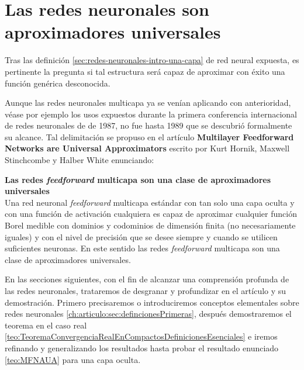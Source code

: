 %
\section{Las redes neuronales son aproximadores universales}  

Tras las definición \ref{sec:redes-neuronales-intro-una-capa} de red neural expuesta,
es pertinente la pregunta si tal estructura será 
capaz de aproximar con éxito una función genérica desconocida.   

Aunque las redes neuronales multicapa ya se venían aplicando con anterioridad, 
véase por ejemplo los usos expuestos durante la primera conferencia
internacional de redes neuronales de \cite{4307059} de 1987, 
no fue hasta 1989 que se descubrió formalmente su alcance.
 Tal delimitación se propuso en el artículo 
\textbf{Multilayer Feedforward Networks are Universal Approximators} \cite{HORNIK1989359}
 escrito por Kurt Hornik, Maxwell Stinchcombe y Halber White enunciando: 

\begin{teorema}\textbf{Las redes \textit{feedforward} multicapa son una clase de aproximadores universales } \label{teo:MFNAUA}
    \\
    Una red neuronal \textit{feedforward} multicapa estándar con tan solo una capa oculta y con una función de activación cualquiera es capaz de aproximar cualquier 
    función Borel medible  con dominios y codominios de dimensión finita (no necesariamente iguales) y con el nivel de precisión que se desee siempre y cuando 
    se utilicen suficientes neuronas. En este sentido las redes \textit{feedforward} multicapa son una clase de aproximadores universales.

\end{teorema}

En las secciones siguientes, con el fin de alcanzar una
 comprensión profunda de las redes neuronales,
trataremos de desgranar y profundizar en el artículo y su 
demostración. Primero precisaremos o introduciremos conceptos elementales 
sobre redes neuronales \ref{ch:articulo:sec:defincionesPrimeras}, después 
demostraremos el teorema en el caso real 
\ref{teo:TeoremaConvergenciaRealEnCompactosDefinicionesEsenciales} e iremos refinando y generalizando los resultados hasta probar
el resultado enunciado \ref{teo:MFNAUA} para una capa oculta.

